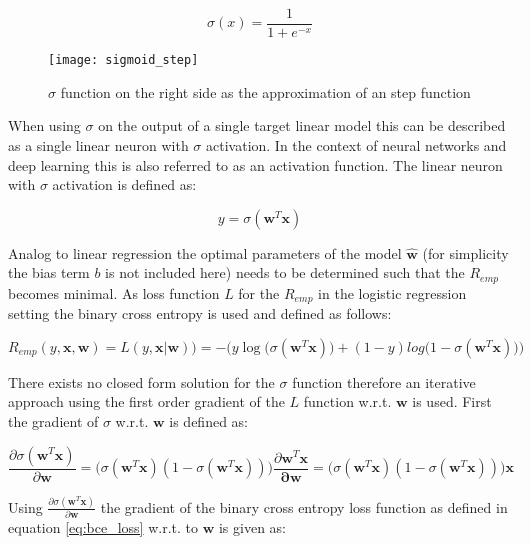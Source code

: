 \documentclass[../main.tex]{subfiles}
\begin{document}
\begin{equation}
    \sigma(x)=\frac{1}{1+e^{-x}}
\end{equation}

\begin{figure}[H]
    \centering
    \texttt{[image: sigmoid\_step]}
    \caption{$\sigma$ function on the right side as the approximation of an step function}
    \label{fig:sigmoid_step}
\end{figure}

When using $\sigma$ on the output of a single target linear model this can be described as a single linear neuron with $\sigma$ activation. In the context of neural networks and deep learning this is also referred to as an activation function. The linear neuron with $\sigma$ activation is defined as:

\begin{equation} \label{eq:logneuron}
    y=\sigma(\mathbf{w}^T\mathbf{x})
\end{equation}

Analog to linear regression the optimal parameters of the model $\mathbf{\hat{w}}$ (for simplicity the bias term $b$ is not included here) needs to be determined such that the $R_{emp}$ becomes minimal. As loss function $L$ for the $R_{emp}$ in the logistic regression setting the binary cross entropy is used and defined as follows:

\begin{equation} \label{eq:bce_loss}
    R_{emp}(y, \mathbf{x}, \mathbf{w})=L(y, \mathbf{x} | \mathbf{w}))=- \bigg( y\log\Big(\sigma(\mathbf{w}^T\mathbf{x})\Big) + (1-y) log \Big(1-\sigma(\mathbf{w}^T\mathbf{x})\Big)\bigg)
\end{equation}

There exists no closed form solution for the $\sigma$ function therefore an iterative approach using the first order gradient of the $L$ function w.r.t. $\mathbf{w}$ is used. First the gradient of $\sigma$ w.r.t. $\mathbf{w}$ is defined as:

\begin{equation}
    \frac{\partial \sigma(\mathbf{w}^T\mathbf{x})}{\partial \mathbf{w}} = \Big( \sigma(\mathbf{w}^T\mathbf{x})(1-\sigma(\mathbf{w}^T\mathbf{x})) \Big) \frac{\partial \mathbf{w}^T\mathbf{x}}{\mathbf{\partial w}}= \Big( \sigma(\mathbf{w}^T\mathbf{x})(1-\sigma(\mathbf{w}^T\mathbf{x})) \Big) \mathbf{x}
\end{equation}

Using $\frac{\partial \sigma(\mathbf{w}^T\mathbf{x})}{\partial \mathbf{w}}$ the gradient of the binary cross entropy loss function as defined in equation \ref{eq:bce_loss} w.r.t. to $\mathbf{w}$ is given as:
\end{document}
